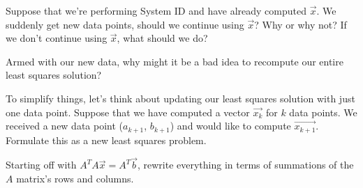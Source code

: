 \begin{enumerate}

\qitem
Suppose that we're performing System ID and have already computed $\vec{x}$. We suddenly get new data points, should we continue using $\vec{x}$? Why or why not? If we don't continue using $\vec{x}$, what should we do?


\qitem
Armed with our new data, why might it be a bad idea to recompute our entire least squares solution?


\qitem
To simplify things, let's think about updating our least squares solution with just one data point.
Suppose that we have computed a vector $\vec{x_k}$ for $k$ data points.
We received a new data point ($a_{k+1}$, $b_{k+1}$) and would like to compute $\vec{x_{k+1}}$.
Formulate this as a new least squares problem.


\qitem
Starting off with $A^{T}A\vec{x} = A^{T}\vec{b}$, rewrite everything in terms of summations of the $A$ matrix's rows and columns.



\end{enumerate}
